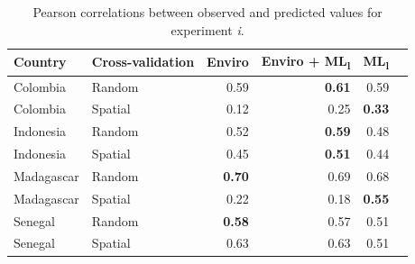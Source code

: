 \documentclass[review]{elsarticle}
\begin{document}
\begin{table}[t!]

\centering
\begin{tabular}{llrrrr}
Country &  Cross-validation & Enviro &  Enviro + ML\textsubscript{l} &  ML\textsubscript{l} \\
\hline 
 Colombia & Random &  0.59 & \textbf{0.61}& 0.59  \\
 Colombia &  Spatial &  0.12 &  0.25&  \textbf{0.33} \\
 Indonesia &  Random &  0.52 &  \textbf{0.59}&  0.48  \\
 Indonesia &  Spatial &  0.45 &  \textbf{0.51}&  0.44  \\
 Madagascar & Random &   \textbf{0.70}& 0.69 &  0.68  \\
 Madagascar &  Spatial &  0.22 & 0.18&  \textbf{0.55} \\
 Senegal &  Random &  \textbf{0.58} & 0.57&  0.51  \\
 Senegal &  Spatial &  0.63 &  0.63&  0.51  \\
\end{tabular}
\caption{Pearson correlations between observed and predicted values for experiment \emph{i}. }
\label{t:results}

\end{table}
\end{document}
